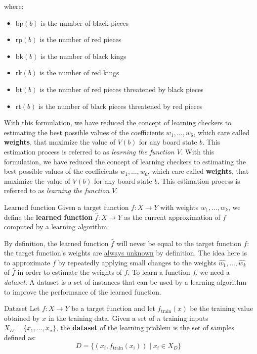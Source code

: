 \documentclass[a4paper, 12pt]{report}
\begin{document}
    where:
    \begin{itemize}
        \item $\mathrm{bp}(b)$ is the number of black pieces
        \item $\mathrm{rp}(b)$ is the number of red pieces
        \item $\mathrm{bk}(b)$ is the number of black kings
        \item $\mathrm{rk}(b)$ is the number of red kings
        \item $\mathrm{bt}(b)$ is the number of red pieces threatened by black pieces
        \item $\mathrm{rt}(b)$ is the number of black pieces threatened by red pieces
    \end{itemize}

    With this formulation, we have reduced the concept of learning checkers to estimating the best possible values of the coefficients $w_1, \ldots, w_6$, which care called \textbf{weights}, that maximize the value of $V(b)$ for any board state $b$. This estimation process is referred to as \textit{learning the function $V$}.
    With this formulation, we have reduced the concept of learning checkers to estimating the best possible values of the coefficients $w_1, \ldots, w_6$, which care called \textbf{weights}, that maximize the value of $V(b)$ for any board state $b$. This estimation process is referred to as \textit{learning the function $V$}.

    \begin{frameddefn}{Learned function}
        Given a target function $f : X \to Y$ with weights $w_1, \ldots, w_k$, we define the \textbf{learned function} $\widehat{f} : X \to Y$ as the current approximation of $f$ computed by a learning algorithm.
    \end{frameddefn}

    By definition, the learned function $\widehat{f}$ will never be equal to the target function $f$: the target function's weights are \underline{always unknown} by definition. The idea here is to approximate $f$ by repeatedly applying small changes to the weights $\widehat{w_1}, \ldots, \widehat{w_k}$ of $\widehat{f}$ in order to estimate the weights of $f$. To learn a function $f$, we need a \textit{dataset}. A dataset is a set of instances that can be used by a learning algorithm to improve the performance of the learned function.
    
    \begin{frameddefn}{Dataset}
        Let $f : X \to Y$ be a target function and let $f_{\mathrm{train}}(x)$ be the training value obtained by $x$ in the training data. Given a set of $n$ training inputs $X_D = \{x_1, \ldots, x_n\}$, the \textbf{dataset} of the learning problem is the set of samples defined as:
        \[D = \{(x_i, f_\mathrm{train}(x_i)) \mid x_i \in X_D\}\]
    \end{frameddefn}
\end{document}
